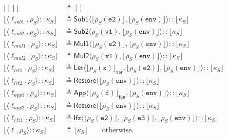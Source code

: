 \documentclass[11pt]{article}
\begin{document}
\begin{align*}
  \lfloor [] \rfloor &\triangleq [] \\
  \lfloor \langle \ell_{\textit{sub1}}, \rho_S \rangle :: \kappa_S \rfloor &\triangleq \textsf{Sub1}\langle \lfloor \rho_S(\texttt{e2})\rfloor, \lfloor \rho_S(\texttt{env}) \rfloor \rangle :: \lfloor \kappa_S \rfloor \\
  \lfloor \langle \ell_{\textit{sub2}}, \rho_S \rangle :: \kappa_S \rfloor &\triangleq \textsf{Sub2}\langle \rho_S(\texttt{v1}), \lfloor \rho_S(\texttt{env}) \rfloor \rangle :: \lfloor \kappa_S \rfloor \\
  \lfloor \langle \ell_{\textit{mul1}}, \rho_S \rangle :: \kappa_S \rfloor &\triangleq \textsf{Mul1}\langle \lfloor \rho_S(\texttt{e2})\rfloor, \lfloor \rho_S(\texttt{env}) \rfloor \rangle :: \lfloor \kappa_S \rfloor \\
  \lfloor \langle \ell_{\textit{mul2}}, \rho_S \rangle :: \kappa_S \rfloor &\triangleq \textsf{Mul2}\langle \rho_S(\texttt{v1}), \lfloor \rho_S(\texttt{env}) \rfloor \rangle :: \lfloor \kappa_S \rfloor \\
  \lfloor \langle \ell_{\textit{let1}}, \rho_S \rangle :: \kappa_S \rfloor &\triangleq \textsf{Let}\langle \lfloor \rho_S(\texttt{x})\rfloor_{\mathsf{var}}, \lfloor \rho_S(\texttt{e2})\rfloor, \lfloor \rho_S(\texttt{env}) \rfloor \rangle :: \lfloor \kappa_S \rfloor \\
  \lfloor \langle \ell_{\textit{let2}}, \rho_S \rangle :: \kappa_S \rfloor &\triangleq \textsf{Restore}\langle \lfloor \rho_S(\texttt{env}) \rfloor \rangle :: \lfloor \kappa_S \rfloor \\
  \lfloor \langle \ell_{\textit{app1}}, \rho_S \rangle :: \kappa_S \rfloor &\triangleq \textsf{App}\langle \lfloor \rho_S(\texttt{f})\rfloor_{\mathsf{fun}}, \lfloor \rho_S(\texttt{env}) \rfloor \rangle :: \lfloor \kappa_S \rfloor \\
  \lfloor \langle \ell_{\textit{app2}}, \rho_S \rangle :: \kappa_S \rfloor &\triangleq \textsf{Restore}\langle \lfloor \rho_S(\texttt{env}) \rfloor \rangle :: \lfloor \kappa_S \rfloor \\
  \lfloor \langle \ell_{\textit{ifz1}}, \rho_S \rangle :: \kappa_S \rfloor &\triangleq \textsf{Ifz}\langle \lfloor \rho_S(\texttt{e2})\rfloor, \lfloor \rho_S(\texttt{e3})\rfloor, \lfloor \rho_S(\texttt{env}) \rfloor \rangle :: \lfloor \kappa_S \rfloor \\
  \lfloor \langle \ell, \rho_S \rangle :: \kappa_S \rfloor &\triangleq \lfloor \kappa_S \rfloor \qquad \text{otherwise.}
\end{align*}
\end{document}

